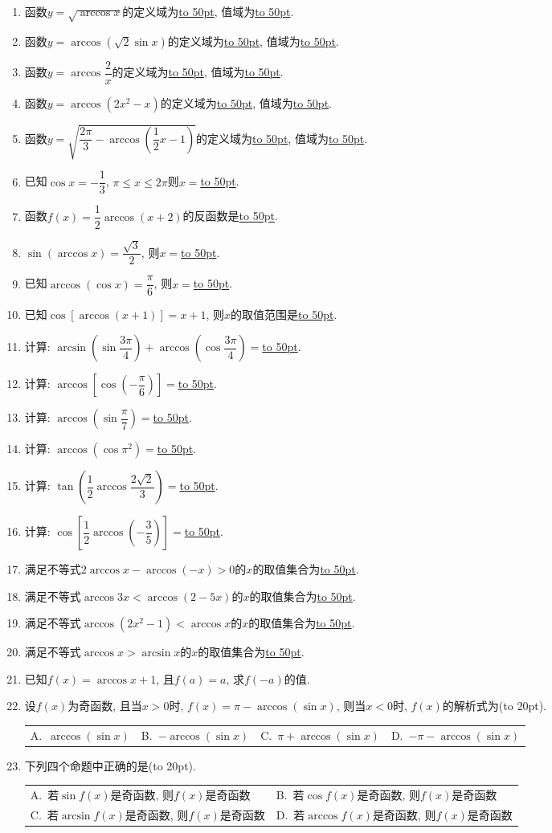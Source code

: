 \documentclass[10pt,a4paper]{article}
\newcommand{\blank}[1]{\underline{\hbox to #1pt{}}}
\newcommand{\bracket}[1]{(\hbox to #1pt{})}
\newcommand{\twoch}[4]{\par\begin{tabular}{p{.46\textwidth}p{.46\textwidth}}
A.~#1& B.~#2\\
C.~#3& D.~#4
\end{tabular}}
\newcommand{\fourch}[4]{\par\begin{tabular}{p{.23\textwidth}p{.23\textwidth}p{.23\textwidth}p{.23\textwidth}}
A.~#1 &B.~#2& C.~#3& D.~#4
\end{tabular}}
\begin{document}
\begin{enumerate}[1.]
\item 函数$y=\sqrt {\arccos x}$的定义域为\blank{50}, 值域为\blank{50}.
\item 函数$y=\arccos (\sqrt 2\sin x)$的定义域为\blank{50}, 值域为\blank{50}.
\item 函数$y=\arccos \dfrac 2x$的定义域为\blank{50}, 值域为\blank{50}.
\item 函数$y=\arccos (2x^2-x)$的定义域为\blank{50}, 值域为\blank{50}.
\item 函数$y=\sqrt {\dfrac{2\pi }3-\arccos (\dfrac 12x-1)}$的定义域为\blank{50}, 值域为\blank{50}.
\item 已知$\cos x=-\dfrac 13$, $\pi \le x\le 2\pi$则$x=$\blank{50}.
\item 函数$f(x)=\dfrac 12\arccos (x+2)$的反函数是\blank{50}.
\item $\sin (\arccos x)=\dfrac{\sqrt 3}2$, 则$x=$\blank{50}.
\item 已知$\arccos (\cos x)=\dfrac{\pi }6$, 则$x=$\blank{50}.
\item 已知$\cos [\arccos (x+1)]=x+1$, 则$x$的取值范围是\blank{50}.
\item 计算: $\arcsin (\sin \dfrac{3\pi }4)+\arccos (\cos \dfrac{3\pi }4)=$\blank{50}.
\item 计算: $\arccos [\cos (-\dfrac{\pi }6)]=$\blank{50}.
\item 计算: $\arccos (\sin \dfrac{\pi }7)=$\blank{50}.
\item 计算: $\arccos (\cos \pi ^2)=$\blank{50}.
\item 计算: $\tan (\dfrac 12\arccos \dfrac{2\sqrt 2}3)=$\blank{50}.
\item 计算: $\cos [\dfrac 12\arccos (-\dfrac 35)]=$\blank{50}.
\item 满足不等式$2\arccos x-\arccos (-x)>0$的$x$的取值集合为\blank{50}.
\item 满足不等式$\arccos 3x<\arccos (2-5x)$的$x$的取值集合为\blank{50}.
\item 满足不等式$\arccos (2x^2-1)<\arccos x$的$x$的取值集合为\blank{50}.
\item 满足不等式$\arccos x>\arcsin x$的$x$的取值集合为\blank{50}.
\item 已知$f(x)=\arccos x+1$, 且$f(a)=a$, 求$f(-a)$的值.
\item 设$f(x)$为奇函数, 且当$x>0$时, $f(x)=\pi -\arccos (\sin x)$, 则当$x<0$时, $f(x)$的解析式为\bracket{20}.
\fourch{$\arccos (\sin x)$}{$-\arccos (\sin x)$}{$\pi +\arccos (\sin x)$}{$-\pi -\arccos (\sin x)$}
\item 下列四个命题中正确的是\bracket{20}.
\twoch{若$\sin f(x)$是奇函数, 则$f(x)$是奇函数}{若$\cos f(x)$是奇函数, 则$f(x)$是奇函数}{若$\arcsin f(x)$是奇函数, 则$f(x)$是奇函数}{若$\arccos f(x)$是奇函数, 则$f(x)$是奇函数}

\end{enumerate}
\end{document}
